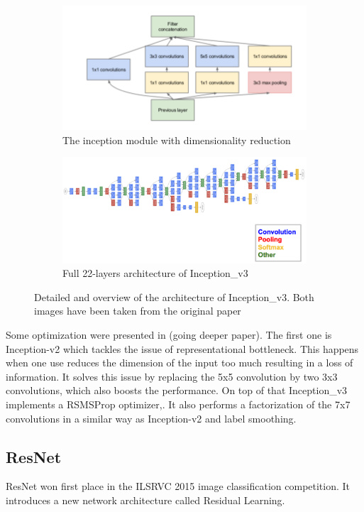 \begin{figure}
\begin{subfigure}{.5\textwidth}
  \centering
  \includegraphics[width=.8\linewidth]{figures/02-inception_module}
  \caption{The inception module with dimensionality reduction }
  \label{fig:inception}
\end{subfigure}%
\begin{subfigure}{.5\textwidth}
  \centering
  \includegraphics[width=.8\linewidth]{figures/02-googlearch}
  \caption{Full 22-layers architecture of Inception\_v3}
  \label{fig:googl}
\end{subfigure}
\caption[Inception network architecture]{Detailed and overview of the architecture of Inception\_v3. Both images have been taken from the original paper \cite{googlepaper}}
\end{figure}
Some optimization were presented in (going deeper paper). The first one is Inception-v2 which tackles the issue of representational bottleneck. This happens when one use reduces the dimension of the input too much resulting in a loss of information. It solves this issue by replacing the 5x5 convolution by two 3x3 convolutions, which also boosts the performance. On top of that Inception\_v3 implements a RSMSProp optimizer,. It also performs a factorization of the 7x7 convolutions in a similar way as Inception-v2 and label smoothing. 

\subsection{ResNet}
ResNet won first place in the ILSRVC 2015 image classification competition. It introduces a new network architecture called Residual Learning. 

